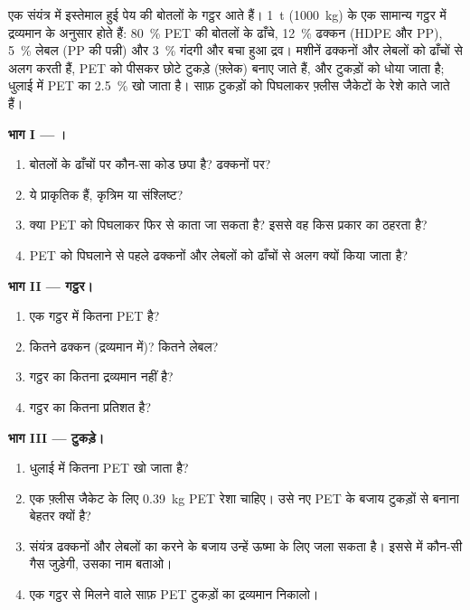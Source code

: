 \begin{problem}
\label{pb:g8:plastics:1}
एक  संयंत्र में इस्तेमाल हुई पेय की बोतलों के गट्ठर आते हैं। \qty{1}{t}
(\qty{1000}{kg}) के एक सामान्य गट्ठर में द्रव्यमान के अनुसार होते हैं:
\qty{80}{\percent} PET की बोतलों के ढाँचे, \qty{12}{\percent} ढक्कन (HDPE
और PP), \qty{5}{\percent} लेबल (PP की पन्नी) और \qty{3}{\percent} गंदगी
और बचा हुआ द्रव। मशीनें ढक्कनों और लेबलों को ढाँचों से अलग करती हैं, PET
को पीसकर छोटे टुकड़े (फ़्लेक) बनाए जाते हैं, और टुकड़ों को धोया जाता है; धुलाई
में PET का \qty{2.5}{\percent} खो जाता है। साफ़ टुकड़ों को पिघलाकर फ़्लीस
जैकेटों के रेशे काते जाते हैं।

\medskip
\noindent\textbf{भाग I --- ।}
\begin{enumerate}
  \item बोतलों के ढाँचों पर कौन-सा कोड छपा है? ढक्कनों पर?
  \item ये  प्राकृतिक हैं, कृत्रिम या संश्लिष्ट?
  \item क्या PET को पिघलाकर फिर से काता जा सकता है? इससे वह किस प्रकार का
         ठहरता है?
  \item PET को पिघलाने से पहले ढक्कनों और लेबलों को ढाँचों से अलग क्यों
        किया जाता है?
\end{enumerate}

\medskip
\noindent\textbf{भाग II --- गट्ठर।}
\begin{enumerate}[resume]
  \item एक गट्ठर में कितना PET है?
  \item कितने ढक्कन (द्रव्यमान में)? कितने लेबल?
  \item गट्ठर का कितना द्रव्यमान  नहीं है?
  \item गट्ठर का कितना प्रतिशत  है?
\end{enumerate}

\medskip
\noindent\textbf{भाग III --- टुकड़े।}
\begin{enumerate}[resume]
  \item धुलाई में कितना PET खो जाता है?
  \item एक फ़्लीस जैकेट के लिए \qty{0.39}{kg} PET रेशा चाहिए। उसे नए PET के
        बजाय टुकड़ों से बनाना बेहतर क्यों है?
  \item संयंत्र ढक्कनों और लेबलों का  करने के बजाय उन्हें ऊष्मा के लिए
        जला सकता है। इससे  में कौन-सी गैस जुड़ेगी, उसका नाम बताओ।
  \item एक गट्ठर से मिलने वाले साफ़ PET टुकड़ों का द्रव्यमान निकालो।
\end{enumerate}
\end{problem}
